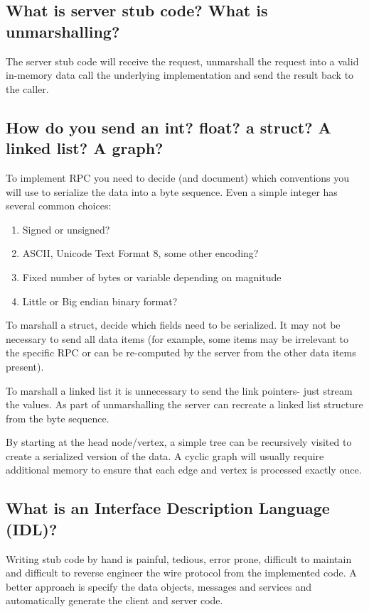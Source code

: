 \subsection{What is server stub code? What is unmarshalling?}

The server stub code will receive the request, unmarshall the request into a valid in-memory data call the underlying implementation and send the result back to the caller.

\subsection{How do you send an int? float? a struct? A linked list? A graph?}

To implement RPC you need to decide (and document) which conventions you will use to serialize the data into a byte sequence.
Even a simple integer has several common choices:

\begin{enumerate}
\item Signed or unsigned?
\item ASCII, Unicode Text Format 8, some other encoding?
\item Fixed number of bytes or variable depending on magnitude
\item Little or Big endian binary format?
\end{enumerate}

To marshall a struct, decide which fields need to be serialized.
It may not be necessary to send all data items (for example, some items may be irrelevant to the specific RPC or can be re-computed by the server from the other data items present).

To marshall a linked list it is unnecessary to send the link pointers- just stream the values.
As part of unmarshalling the server can recreate a linked list structure from the byte sequence.

By starting at the head node/vertex, a simple tree can be recursively visited to create a serialized version of the data.
A cyclic graph will usually require additional memory to ensure that each edge and vertex is processed exactly once.

\subsection{What is an Interface Description Language (IDL)?}

Writing stub code by hand is painful, tedious, error prone, difficult to maintain and difficult to reverse engineer the wire protocol from the implemented code.
A better approach is specify the data objects, messages and services and automatically generate the client and server code.

